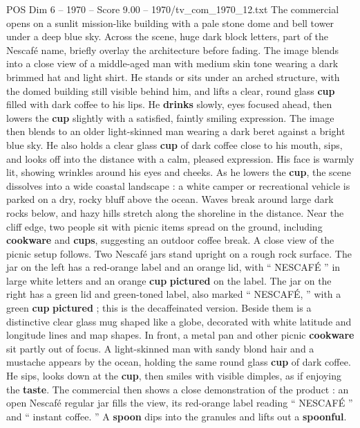 \begin{textsample}{POS Dim 6 – 1970 – Score 9.00 – 1970/tv\_com\_1970\_12.txt}  \label{ex:f6_pos_045}
The commercial opens on a sunlit mission-like building with a pale stone dome and bell tower under a deep blue sky.
Across the scene, huge dark block letters, part of the Nescafé name, briefly overlay the architecture before fading.
The image blends into a close view of a middle-aged man with medium skin tone wearing a dark brimmed hat and light shirt.
He stands or sits under an arched structure, with the domed building still visible behind him, and lifts a clear, round glass \textbf{cup} filled with dark coffee to his lips.
He \textbf{drinks} slowly, eyes focused ahead, then lowers the \textbf{cup} slightly with a satisfied, faintly smiling expression.
The image then blends to an older light-skinned man wearing a dark beret against a bright blue sky.
He also holds a clear glass \textbf{cup} of dark coffee close to his mouth, sips, and looks off into the distance with a calm, pleased expression.
His face is warmly lit, showing wrinkles around his eyes and cheeks.
As he lowers the \textbf{cup}, the scene dissolves into a wide coastal landscape : a white camper or recreational vehicle is parked on a dry, rocky bluff above the ocean.
Waves break around large dark rocks below, and hazy hills stretch along the shoreline in the distance.
Near the cliff edge, two people sit with picnic items spread on the ground, including \textbf{cookware} and \textbf{cups}, suggesting an outdoor coffee break.
A close view of the picnic setup follows.
Two Nescafé jars stand upright on a rough rock surface.
The jar on the left has a red-orange label and an orange lid, with “ NESCAFÉ ” in large white letters and an orange \textbf{cup} \textbf{pictured} on the label.
The jar on the right has a green lid and green-toned label, also marked “ NESCAFÉ, ” with a green \textbf{cup} \textbf{pictured} ; this is the decaffeinated version.
Beside them is a distinctive clear glass mug shaped like a globe, decorated with white latitude and longitude lines and map shapes.
In front, a metal pan and other picnic \textbf{cookware} sit partly out of focus.
A light-skinned man with sandy blond hair and a mustache appears by the ocean, holding the same round glass \textbf{cup} of dark coffee.
He sips, looks down at the \textbf{cup}, then smiles with visible dimples, as if enjoying the \textbf{taste}.
The commercial then shows a close demonstration of the product : an open Nescafé regular jar fills the view, its red-orange label reading “ NESCAFÉ ” and “ instant coffee. ” A \textbf{spoon} dips into the granules and lifts out a \textbf{spoonful}.

\end{textsample}
